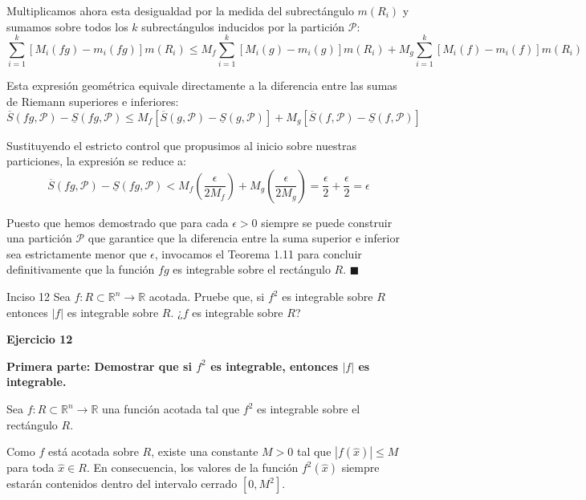 \documentclass[11pt,letterpaper]{article}
\begin{document}
Multiplicamos ahora esta desigualdad por la medida del subrectángulo $m(R_i)$ y sumamos sobre todos los $k$ subrectángulos inducidos por la partición $\mathcal{P}$:
\begin{equation*}
\sum_{i=1}^{k} \left[ M_i(fg) - m_i(fg) \right] m(R_i) \le M_f \sum_{i=1}^{k} \left[ M_i(g) - m_i(g) \right] m(R_i) + M_g \sum_{i=1}^{k} \left[ M_i(f) - m_i(f) \right] m(R_i)
\end{equation*}

Esta expresión geométrica equivale directamente a la diferencia entre las sumas de Riemann superiores e inferiores:
\begin{equation*}
\overline{S}(fg, \mathcal{P}) - \underline{S}(fg, \mathcal{P}) \le M_f \left[ \overline{S}(g, \mathcal{P}) - \underline{S}(g, \mathcal{P}) \right] + M_g \left[ \overline{S}(f, \mathcal{P}) - \underline{S}(f, \mathcal{P}) \right]
\end{equation*}

Sustituyendo el estricto control que propusimos al inicio sobre nuestras particiones, la expresión se reduce a:
\begin{equation*}
\overline{S}(fg, \mathcal{P}) - \underline{S}(fg, \mathcal{P}) < M_f \left( \frac{\epsilon}{2M_f} \right) + M_g \left( \frac{\epsilon}{2M_g} \right) = \frac{\epsilon}{2} + \frac{\epsilon}{2} = \epsilon
\end{equation*}

Puesto que hemos demostrado que para cada $\epsilon > 0$ siempre se puede construir una partición $\mathcal{P}$ que garantice que la diferencia entre la suma superior e inferior sea estrictamente menor que $\epsilon$, invocamos el Teorema 1.11 para concluir definitivamente que la función $fg$ es integrable sobre el rectángulo $R$. \hfill $\blacksquare$


\begin{inciso}{Inciso 12}
Sea $f:R\subset\mathbb{R}^{n}\rightarrow\mathbb{R}$ acotada. Pruebe que, si $f^{2}$ es integrable sobre $R$ entonces $|f|$ es integrable sobre $R$. ¿$f$ es integrable sobre $R$?
\end{inciso}

\textbf{Ejercicio 12}

\textbf{Primera parte: Demostrar que si $f^2$ es integrable, entonces $|f|$ es integrable.}

Sea $f: R \subset \mathbb{R}^n \rightarrow \mathbb{R}$ una función acotada tal que $f^2$ es integrable sobre el rectángulo $R$.

Como $f$ está acotada sobre $R$, existe una constante $M > 0$ tal que $|f(\hat{x})| \le M$ para toda $\hat{x} \in R$. En consecuencia, los valores de la función $f^2(\hat{x})$ siempre estarán contenidos dentro del intervalo cerrado $[0, M^2]$.
\end{document}
